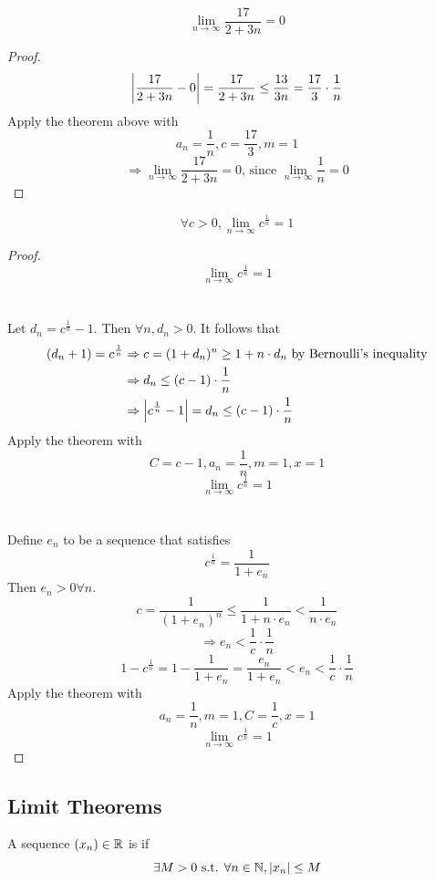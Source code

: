 \documentclass[a4paper,12pt]{article}
\begin{document}
\begin{proposition}
    \[\lim_{n\to\infty}\frac{17}{2+3n}=0\]
    \begin{proof}
        \[\left\lvert \frac{17}{2+3n}-0\right\rvert = \frac{17}{2+3n} \le \frac{13}{3n} = \frac{17}{3}\cdot\frac{1}{n}\]
        Apply the theorem above with \[a_n=\frac{1}{n},c = \frac{17}{3}, m=1\]
        \[\Rightarrow\lim_{n\to\infty}\frac{17}{2+3n}=0\text{, since }\lim_{n\to\infty}\frac{1}{n}=0\]
    \end{proof}
\end{proposition}

\newpage
\begin{proposition}
    \[\forall c>0, \lim_{n\to\infty}c^{\frac{1}{n}}=1\]
    \begin{proof}

         \[\lim_{n\to\infty}c^{\frac{1}{n}}=1\]
        \\\\
        Let \(d_n = c^{\frac{1}{n}}-1\). Then \(\forall n, d_n>0\). It follows that 
        \begin{align*}
            (d_n+1)=c^{\frac{1}{n}} & \Rightarrow c= (1+d_n)^n\ge 1+n\cdot d_n\text{ by Bernoulli's inequality}\\
            & \Rightarrow d_n\le (c-1)\cdot \frac{1}{n} \\
            & \Rightarrow \left\lvert c^{\frac{1}{n}}-1\right\rvert = d_n\le (c-1)\cdot\frac{1}{n}
        \end{align*}
        Apply the theorem with \[C = c-1,a_n = \frac{1}{n}, m=1,x=1\]
        \[\lim_{n\to\infty}c^{\frac{1}{n}}=1\]
        \\\\
        Define \(e_n\) to be a sequence that satisfies \[c^{\frac{1}{n}} = \frac{1}{1+e_n}\]
        Then \(e_n>0\forall n\).
        \[c = \frac{1}{(1+e_n)^n}\le\frac{1}{1+n\cdot e_n} < \frac{1}{n\cdot e_n}\]
        \[\Rightarrow e_n < \frac{1}{c}\cdot \frac{1}{n}\]
        \[1-c^{\frac{1}{n}}= 1-\frac{1}{1+e_n}= \frac{e_n}{1+e_n}<e_n<\frac{1}{c}\cdot \frac{1}{n}\]
        Apply the theorem with \[a_n = \frac{1}{n}, m=1,C=\frac{1}{c}, x=1\]
        \[\lim_{n\to\infty} c^\frac{1}{n}=1\]
    \end{proof}
\end{proposition}

\newpage
\subsection{Limit Theorems}
\begin{definition}
    A sequence \((x_{n})\in\mathbb{R}\) is  if
    \[\exists M>0 \text{ s.t. }\forall n\in\mathbb{N}, \left\lvert x_n\right\rvert\le M\]
\end{definition}
\end{document}
